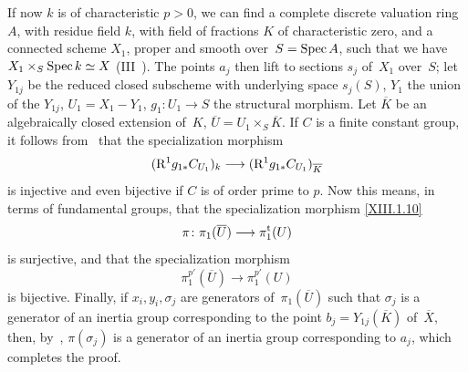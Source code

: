 If now $k$ is of
characteristic $p>0$, we can find a complete discrete valuation
ring $A$, with residue field $k$, with field of
fractions $K$ of characteristic zero, and a connected
scheme $X_1$, proper and smooth over~$S=\operatorname{Spec} A$, such that we have
$X_1\times_S \operatorname{Spec} k\simeq X$ (III~). The points $a_j$ then
lift to sections $s_j$ of~$X_1$ over~$S$;
let $Y_{1j}$ be the reduced closed subscheme with
underlying space $s_j(S)$, $Y_1$ the union of the $Y_{1j}$,
$U_1=X_1-Y_1$, $g_1\colon U_1\to S$ the structural
morphism. Let $\overline{K}$ be an algebraically closed extension
of~$K$, $\overline{U}= U_1\times_S\overline{K}$. If $C$ is a
finite constant group, it follows from~ that the
specialization morphism
$$
(\R^1g_{1*}C_{U_1})_k\to(\R^1g_{1*}C_{U_1})_{\overline{K}}
$$
is injective and even bijective if $C$ is of order prime to
$p$. Now this means, in terms of fundamental groups, that the
specialization morphism \eqref{XIII.1.10}
$$
\pi \colon \pi_1(\overline{U})\to\pi^{\tame}_1(U)
$$
is surjective, and that the specialization morphism
$$
\pi^{p'}_1(\overline{U})\to\pi^{p'}_1(U)
$$
is bijective. Finally, if $x_i, y_i,\sigma_j$ are
generators of~$\pi_1(\overline{U})$ such that $\sigma_j$ is
a generator of an inertia group corresponding to the point
$b_j=Y_{1j}(\overline{K})$ of~$\overline{X}$, then,
by~, $\pi(\sigma_j)$ is a generator
of an inertia group corresponding to $a_j$, which completes the
proof.

